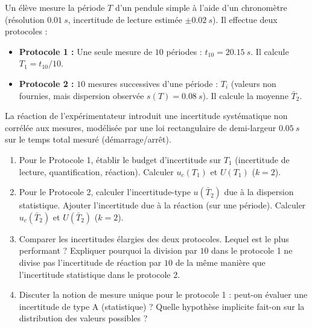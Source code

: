 \documentclass[11pt]{article}
\begin{document}
\begin{exercice}
Un élève mesure la période $T$ d'un pendule simple à l'aide d'un chronomètre (résolution $\SI{0,01}{s}$, incertitude de lecture estimée $\pm \SI{0,02}{s}$). Il effectue deux protocoles :
\begin{itemize}
    \item \textbf{Protocole 1 :} Une seule mesure de $10$ périodes : $t_{10} = \SI{20,15}{s}$. Il calcule $T_1 = t_{10}/10$.
    \item \textbf{Protocole 2 :} $10$ mesures successives d'une période : $T_i$ (valeurs non fournies, mais dispersion observée $s(T) = \SI{0,08}{s}$). Il calcule la moyenne $\bar{T}_2$.
\end{itemize}
La réaction de l'expérimentateur introduit une incertitude systématique non corrélée aux mesures, modélisée par une loi rectangulaire de demi-largeur $\SI{0,05}{s}$ sur le temps total mesuré (démarrage/arrêt).
\begin{enumerate}
    \item Pour le Protocole 1, établir le budget d'incertitude sur $T_1$ (incertitude de lecture, quantification, réaction). Calculer $u_c(T_1)$ et $U(T_1)$ ($k=2$).
    \item Pour le Protocole 2, calculer l'incertitude-type $u(\bar{T}_2)$ due à la dispersion statistique. Ajouter l'incertitude due à la réaction (sur une période). Calculer $u_c(\bar{T}_2)$ et $U(\bar{T}_2)$ ($k=2$).
    \item Comparer les incertitudes élargies des deux protocoles. Lequel est le plus performant ? Expliquer pourquoi la division par $10$ dans le protocole 1 ne divise pas l'incertitude de réaction par $10$ de la même manière que l'incertitude statistique dans le protocole 2.
    \item Discuter la notion de \og mesure unique \fg pour le protocole 1 : peut-on évaluer une incertitude de type A (statistique) ? Quelle hypothèse implicite fait-on sur la distribution des valeurs possibles ?
\end{enumerate}
\end{exercice}
\end{document}
